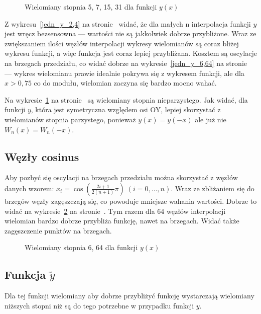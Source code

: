 \documentclass[a4paper,11pt]{article}
\begin{document}
\begin{figure}
    \begin{center}
                
    \end{center}
    \caption{Wielomiany stopnia 5, 7, 15, 31 dla funkcji \(y(x)\)}
    \label{jedn_y_5,7,15,31}
\end{figure}

Z wykresu~\ref{jedn_y_2,4} na stronie~\pageref{jedn_y_2,4} widać, że dla małych 
n interpolacja funkcji \(y\) jest wręcz bezsensowna --- wartości nie są 
jakkolwiek dobrze przybliżone. Wraz ze zwiększaniem ilości węzłów interpolacji 
wykresy wielomianów są coraz bliżej wykresu funkcji, a więc funkcja jest coraz
lepiej przybliżana. Kosztem są oscylacje na brzegach przedziału, co widać dobrze
na wykresie~\ref{jedn_y_6,64} na stronie~\pageref{jedn_y_6,64} --- wykres
wielomianu prawie idealnie pokrywa się z wykresem funkcji, ale dla
\(x > 0,75\) co do modułu, wielomian zaczyna się bardzo mocno wahać.

Na wykresie~\ref{jedn_y_5,7,15,31} na stronie~\pageref{jedn_y_5,7,15,31}
są wielomiany stopnia nieparzystego. Jak widać, dla funkcji \(y\), która jest
symetryczna względem osi OY, lepiej skorzystać z wielomianów stopnia parzystego,
ponieważ \(y(x) = y(-x)\) ale już nie \(W_n(x) = W_n(-x)\).

\subsection{Węzły cosinus}

Aby pozbyć się oscylacji na brzegach przedziału można skorzystać z węzłów danych
wzorem: \(x_i=\cos(\frac{2i+1}{2(n+1)}\pi) \; (i = 0,\ldots, n)\).
Wraz ze zbliżaniem się do brzegów węzły zagęszczają się, co powoduje mniejsze
wahania wartości. Dobrze to widać na wykresie~\ref{cos_y_6,64} na 
stronie~\pageref{cos_y_6,64}. Tym razem dla 64 węzłów interpolacji wielomian
bardzo dobrze przybliża funkcję, nawet na brzegach. Widać także zagęszczenie
punktów na brzegach.

\begin{figure}[h]
    \begin{center}
        
    \end{center}
    \caption{Wielomiany stopnia 6, 64 dla funkcji \(y(x)\)}
    \label{cos_y_6,64}
\end{figure}

\subsection{Funkcja \(\tilde{y}\)}
Dla tej funkcji wielomiany aby dobrze przybliżyć funkcję wystarczają
wielomiany niższych stopni niż są do tego potrzebne w przypadku funkcji \(y\).
\end{document}
